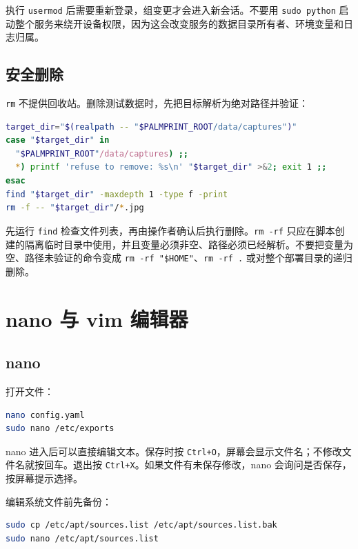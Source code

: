 执行 \passthrough{\lstinline!usermod!}
后需要重新登录，组变更才会进入新会话。不要用
\passthrough{\lstinline!sudo python!}
启动整个服务来绕开设备权限，因为这会改变服务的数据目录所有者、环境变量和日志归属。

\subsection{安全删除}\label{ux5b89ux5168ux5220ux9664}

\passthrough{\lstinline!rm!}
不提供回收站。删除测试数据时，先把目标解析为绝对路径并验证：

\begin{lstlisting}[language=bash]
target_dir="$(realpath -- "$PALMPRINT_ROOT/data/captures")"
case "$target_dir" in
  "$PALMPRINT_ROOT"/data/captures) ;;
  *) printf 'refuse to remove: %s\n' "$target_dir" >&2; exit 1 ;;
esac
find "$target_dir" -maxdepth 1 -type f -print
rm -f -- "$target_dir"/*.jpg
\end{lstlisting}

先运行 \passthrough{\lstinline!find!}
检查文件列表，再由操作者确认后执行删除。\passthrough{\lstinline!rm -rf!}
只应在脚本创建的隔离临时目录中使用，并且变量必须非空、路径必须已经解析。不要把变量为空、路径未验证的命令变成
\passthrough{\lstinline!rm -rf "$HOME"!}、\passthrough{\lstinline!rm -rf .!}
或对整个部署目录的递归删除。

\section{nano 与 vim 编辑器}\label{nano-ux4e0e-vim-ux7f16ux8f91ux5668}

\subsection{nano}\label{nano}

打开文件：

\begin{lstlisting}[language=bash]
nano config.yaml
sudo nano /etc/exports
\end{lstlisting}

nano 进入后可以直接编辑文本。保存时按
\passthrough{\lstinline!Ctrl+O!}，屏幕会显示文件名；不修改文件名就按回车。退出按
\passthrough{\lstinline!Ctrl+X!}。如果文件有未保存修改，nano
会询问是否保存，按屏幕提示选择。

编辑系统文件前先备份：

\begin{lstlisting}[language=bash]
sudo cp /etc/apt/sources.list /etc/apt/sources.list.bak
sudo nano /etc/apt/sources.list
\end{lstlisting}

